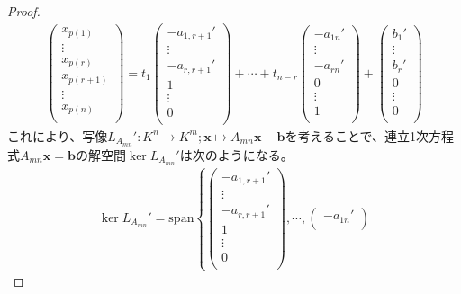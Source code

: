 \documentclass[dvipdfmx]{jsarticle}
\begin{document}
\begin{proof}
\begin{align*}
\begin{pmatrix}
x_{p(1)} \\
 \vdots \\
x_{p(r)} \\
x_{p(r + 1)} \\
 \vdots \\
x_{p(n)} \\
\end{pmatrix} = t_{1}\begin{pmatrix}
 - a_{1,r + 1}' \\
 \vdots \\
 - a_{r,r + 1}' \\
1 \\
 \vdots \\
0 \\
\end{pmatrix} + \cdots + t_{n - r}\begin{pmatrix}
 - a_{1n}' \\
 \vdots \\
 - a_{rn}' \\
0 \\
 \vdots \\
1 \\
\end{pmatrix} + \begin{pmatrix}
b_{1}' \\
 \vdots \\
b_{r}' \\
0 \\
 \vdots \\
0 \\
\end{pmatrix}
\end{align*}
これにより、写像$L_{A_{mn}}':K^{n} \rightarrow K^{m};\mathbf{x} \mapsto A_{mn}\mathbf{x} - \mathbf{b}$を考えることで、連立1次方程式$A_{mn}\mathbf{x} = \mathbf{b}$の解空間$\ker L_{A_{mn}}'$は次のようになる。
\begin{align*}
\ker L_{A_{mn}}' = {\mathrm{span} }\left\{ \begin{pmatrix}
 - a_{1,r + 1}' \\
 \vdots \\
 - a_{r,r + 1}' \\
1 \\
 \vdots \\
0 \\
\end{pmatrix},\cdots,\begin{pmatrix}
 - a_{1n}' \\

\end{pmatrix}
\end{align*}
\end{proof}
\end{document}
